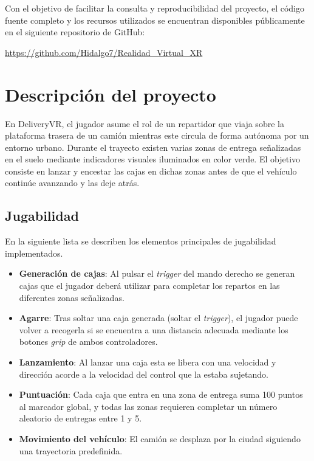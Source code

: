 \documentclass[12pt, a4paper]{article}
\begin{document}
Con el objetivo de facilitar la consulta y reproducibilidad del proyecto, el código fuente completo y los recursos utilizados se encuentran disponibles públicamente en el siguiente repositorio de GitHub:

\url{https://github.com/Hidalgo7/Realidad_Virtual_XR}

\section{Descripción del proyecto}

En DeliveryVR, el jugador asume el rol de un repartidor que viaja sobre la plataforma trasera de un camión mientras este circula de forma autónoma por un entorno urbano. Durante el trayecto existen varias zonas de entrega señalizadas en el suelo mediante indicadores visuales iluminados en color verde. El objetivo consiste en lanzar y encestar las cajas en dichas zonas antes de que el vehículo continúe avanzando y las deje atrás. 

\subsection{Jugabilidad}

En la siguiente lista se describen los elementos principales de jugabilidad implementados.

\begin{itemize}[leftmargin=*]
    \item \textbf{Generación de cajas}: Al pulsar el \textit{trigger} del mando derecho se generan cajas que el jugador deberá utilizar para completar los repartos en las diferentes zonas señalizadas.
    \item \textbf{Agarre}: Tras soltar una caja generada (soltar el \textit{trigger}), el jugador puede volver a recogerla si se encuentra a una distancia adecuada mediante los botones \textit{grip} de ambos controladores.
    \item \textbf{Lanzamiento}: Al lanzar una caja esta se libera con una velocidad y dirección acorde a la velocidad del control que la estaba sujetando.
    \item \textbf{Puntuación}: Cada caja que entra en una zona de entrega suma 100 puntos al marcador global, y todas las zonas requieren completar un número aleatorio de entregas entre 1 y 5.
    \item \textbf{Movimiento del vehículo}: El camión se desplaza por la ciudad siguiendo una trayectoria predefinida.
\end{itemize}
\end{document}
